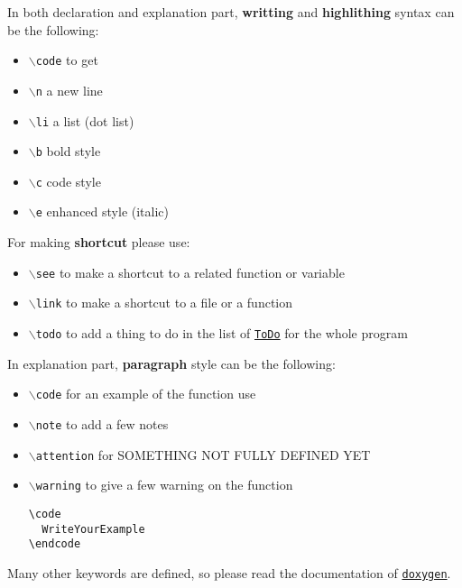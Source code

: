 In both declaration and explanation part, {\bf writting} and {\bf highlithing} syntax can be the following:\par
\par
 \begin{itemize}
\item {\tt $\backslash$code} to get\par
\end{itemize}
\begin{itemize}
\item {\tt $\backslash$n} a new line \item {\tt $\backslash$li} a list (dot list)\end{itemize}
\begin{itemize}
\item {\tt $\backslash$b} bold style \item {\tt $\backslash$c} code style \item {\tt $\backslash$e} enhanced style (italic)\end{itemize}
For making {\bf shortcut} please use:\par
 \begin{itemize}
\item {\tt $\backslash$see} to make a shortcut to a related function or variable \item {\tt $\backslash$link} to make a shortcut to a file or a function 
\item {\tt $\backslash$todo} to add a thing to do in the list of \href{todo.html}{\tt ToDo} for the whole program\end{itemize}
In explanation part, {\bf paragraph} style can be the following:\par
 \begin{itemize}
\item {\tt $\backslash$code} for an example of the function use \item {\tt $\backslash$note} to add a few notes \item {\tt $\backslash$attention} for SOMETHING NOT FULLY DEFINED YET \item {\tt $\backslash$warning} to give a few warning on the function 


\begin{VerbInclude}\begin{verbatim}\code
  WriteYourExample
\endcode
\end{verbatim}
\end{VerbInclude}
\end{itemize}
Many other keywords are defined, so please read the documentation of \href{http://www.doxygen.org/commands.html}{\tt doxygen}. 